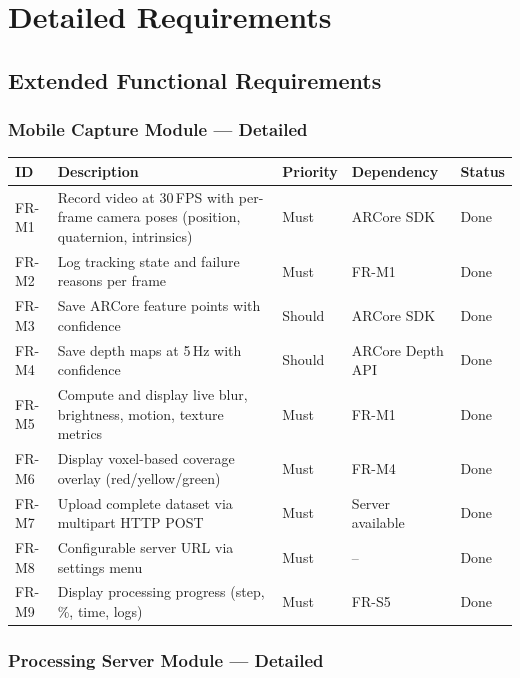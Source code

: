 \chapter{Detailed Requirements}

\section{Extended Functional Requirements}

\subsection{Mobile Capture Module --- Detailed}

\begin{longtable}{p{}p{}p{}p{}p{}}
\toprule
\textbf{ID} & \textbf{Description} & \textbf{Priority} & \textbf{Dependency} & \textbf{Status} \\
\midrule
FR-M1 & Record video at 30\,FPS with per-frame camera poses (position, quaternion, intrinsics) & Must & ARCore SDK & Done \\
FR-M2 & Log tracking state and failure reasons per frame & Must & FR-M1 & Done \\
FR-M3 & Save ARCore feature points with confidence & Should & ARCore SDK & Done \\
FR-M4 & Save depth maps at 5\,Hz with confidence & Should & ARCore Depth API & Done \\
FR-M5 & Compute and display live blur, brightness, motion, texture metrics & Must & FR-M1 & Done \\
FR-M6 & Display voxel-based coverage overlay (red/yellow/green) & Must & FR-M4 & Done \\
FR-M7 & Upload complete dataset via multipart HTTP POST & Must & Server available & Done \\
FR-M8 & Configurable server URL via settings menu & Must & -- & Done \\
FR-M9 & Display processing progress (step, \%, time, logs) & Must & FR-S5 & Done \\
\bottomrule
\end{longtable}

\subsection{Processing Server Module --- Detailed}

